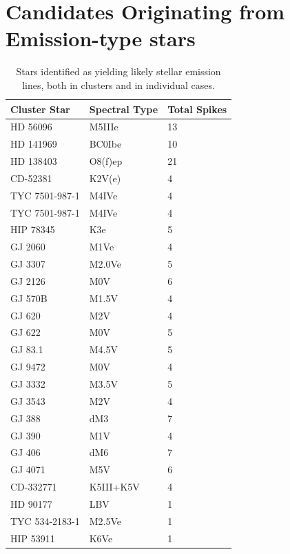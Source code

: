 \documentclass[twocolumn]{aastex701}
\begin{document}
\section{Candidates Originating from  Emission-type stars}
\label{s:confirmedstellaremissionclusters}
\begin{table}[htbp]
\centering
\label{t:emissionstars}
\begin{tabular}{|l|l|l|} 
 \hline
 Cluster Star & Spectral Type & Total Spikes \\ 
 \hline
 HD 56096 & M5IIIe & 13 \\ 
 HD 141969 & BC0Ibe & 10 \\ 
 HD 138403 & O8(f)ep & 21 \\ 
 CD-52381 & K2V(e) & 4 \\
 TYC 7501-987-1 & M4IVe & 4 \\
 TYC 7501-987-1 & M4IVe & 4 \\
 HIP 78345 & K3e & 5 \\
 GJ 2060 & M1Ve & 4 \\
 GJ 3307 & M2.0Ve & 5 \\
 GJ 2126 & M0V & 6 \\
 GJ 570B & M1.5V & 4 \\
 GJ 620 & M2V & 4 \\
 GJ 622 & M0V & 5 \\
 GJ 83.1 & M4.5V & 5 \\
 GJ 9472 & M0V & 4 \\
 GJ 3332 & M3.5V & 5 \\
 GJ 3543 & M2V & 4 \\
 GJ 388 & dM3 & 7 \\
 GJ 390 & M1V & 4 \\
 GJ 406 & dM6 & 7 \\
 GJ 4071 & M5V & 6 \\
 CD-332771 & K5III+K5V & 4 \\
 HD 90177 & LBV & 1 \\
 TYC 534-2183-1 & M2.5Ve & 1 \\
 HIP 53911 & K6Ve & 1 \\
\hline
\end{tabular}
 \caption{Stars identified as yielding likely stellar emission lines, both in clusters and in individual cases.}
\end{table}
\clearpage
\end{document}
